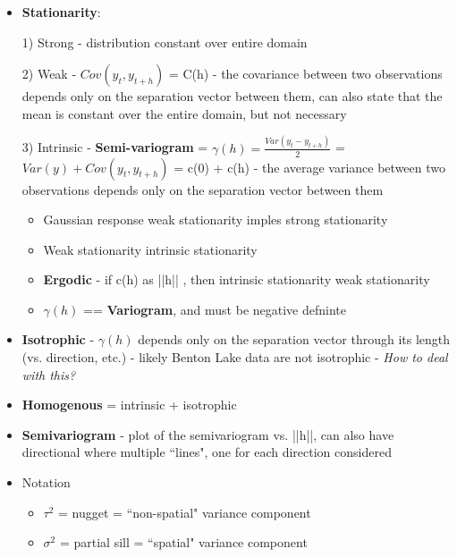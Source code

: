 \documentclass[a4paper]{article}\usepackage[]{graphicx}\usepackage[]{color}
\begin{document}
\begin{itemize}
\item {\bf Stationarity}: 

1) Strong - distribution constant over entire domain

2) Weak - $Cov(y_{t},y_{t+h})$ = C(h) - the covariance between two observations depends only on the separation vector between them, can also state that the mean is constant over the entire domain, but not necessary

3) Intrinsic - {\bf Semi-variogram} = $\gamma(h) = \frac{Var(y_{t} - y_{t+h})}{2}$ = $Var(y) + Cov(y_{t},y_{t+h})$ = c(0) + c(h) - the average variance between two observations depends only on the separation vector between them

\begin{itemize}

\item Gaussian response \rightarrow weak stationarity imples strong stationarity

\item Weak stationarity \rightarrow intrinsic stationarity

\item {\bf Ergodic} - if c(h)  as ||h|| \rightarrow \inf, then intrinsic stationarity \rightarrow weak stationarity

\item $\gamma(h)$ == {\bf Variogram}, and must be negative defninte

\end{itemize}

\item {\bf Isotrophic} - $\gamma(h)$ depends only on the separation vector through its length (vs. direction, etc.) - likely Benton Lake data are not isotrophic - {\it How to deal with this?}

\item {\bf Homogenous} = intrinsic + isotrophic

\item {\bf Semivariogram} - plot of the semivariogram vs. ||h||, can also have directional where multiple ``lines", one for each direction considered

\item Notation

\begin{itemize}
\item $\tau^{2}$ = nugget = ``non-spatial" variance component

\item $\sigma^{2}$ = partial sill = ``spatial" variance component


\end{itemize}
\end{itemize}
\end{document}
